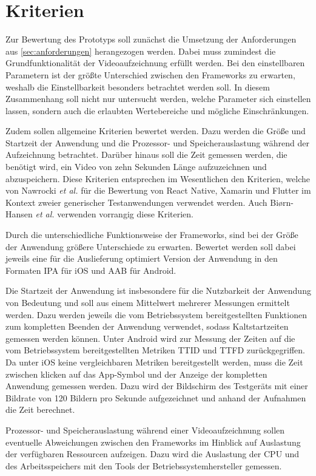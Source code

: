\section{Kriterien}

Zur Bewertung des Prototyps soll zunächst die Umsetzung der Anforderungen aus \autoref{sec:anforderungen} herangezogen werden.
Dabei muss zumindest die Grundfunktionalität der Videoaufzeichnung erfüllt werden.
Bei den einstellbaren Parametern ist der größte Unterschied zwischen den Frameworks zu erwarten, weshalb die Einstellbarkeit besonders betrachtet werden soll.
In diesem Zusammenhang soll nicht nur untersucht werden, welche Parameter sich einstellen lassen, sondern auch die erlaubten Wertebereiche und mögliche Einschränkungen.


Zudem sollen allgemeine Kriterien bewertet werden.
Dazu werden die Größe und Startzeit der Anwendung und die Prozessor- und Speicherauslastung während der Aufzeichnung betrachtet.
Darüber hinaus soll die Zeit gemessen werden, die benötigt wird, ein Video von zehn Sekunden Länge aufzuzeichnen und abzuspeichern.
Diese Kriterien entsprechen im Wesentlichen den Kriterien, welche von Nawrocki \textit{et al.} \cite{Nawrocki_Comparison_Hybrid_Native_Frameworks} für die Bewertung von React Native, Xamarin und Flutter im Kontext zweier generischer Testanwendungen verwendet werden.
Auch Bi{\o}rn-Hansen \textit{et al.} \cite{Biorn-Hansen_PerformanceOverhead_CrossPlatform} verwenden vorrangig diese Kriterien.

Durch die unterschiedliche Funktionsweise der Frameworks, sind bei der Größe der Anwendung größere Unterschiede zu erwarten.
Bewertet werden soll dabei jeweils eine für die Auslieferung optimiert Version der Anwendung in den Formaten \ac{IPA} für iOS und \ac{AAB} für Android.

Die Startzeit der Anwendung ist insbesondere für die Nutzbarkeit der Anwendung von Bedeutung und soll aus einem Mittelwert mehrerer Messungen ermittelt werden.
Dazu werden jeweils die vom Betriebssystem bereitgestellten Funktionen zum kompletten Beenden der Anwendung verwendet, sodass Kaltstartzeiten gemessen werden können.
Unter Android wird zur Messung der Zeiten auf die vom Betriebssystem bereitgestellten Metriken \ac{TTID} und \ac{TTFD} zurückgegriffen.
Da unter iOS keine vergleichbaren Metriken bereitgestellt werden, muss die Zeit zwischen klicken auf das App-Symbol und der Anzeige der kompletten Anwendung gemessen werden.
Dazu wird der Bildschirm des Testgeräts mit einer Bildrate von 120 Bildern pro Sekunde aufgezeichnet und anhand der Aufnahmen die Zeit berechnet.

Prozessor- und Speicherauslastung während einer Videoaufzeichnung sollen eventuelle Abweichungen zwischen den Frameworks im Hinblick auf Auslastung der verfügbaren Ressourcen aufzeigen.
Dazu wird die Auslastung der CPU und des Arbeitsspeichers mit den Tools der Betriebssystemhersteller gemessen.
